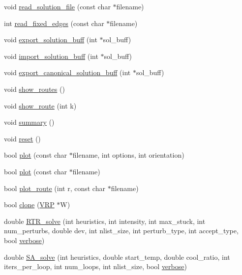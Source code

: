 \begin{DoxyCompactItemize}
\item 
void \hyperlink{class_v_r_p_a88640397d743e6b40095fc2b9a74ad96}{read\_\-solution\_\-file} (const char $\ast$filename)
\item 
int \hyperlink{class_v_r_p_a7b056dcb823f18a187ba74dfe46fe148}{read\_\-fixed\_\-edges} (const char $\ast$filename)
\item 
void \hyperlink{class_v_r_p_a7766815e5d2eaf7972078e389f3cb44d}{export\_\-solution\_\-buff} (int $\ast$sol\_\-buff)
\item 
void \hyperlink{class_v_r_p_a295efd4df161f2aac13aaaedf0e9448c}{import\_\-solution\_\-buff} (int $\ast$sol\_\-buff)
\item 
void \hyperlink{class_v_r_p_adb439544630c4817fc6e9373a3216ef5}{export\_\-canonical\_\-solution\_\-buff} (int $\ast$sol\_\-buff)
\item 
void \hyperlink{class_v_r_p_a220683d7cff96be26550a081f948cfd2}{show\_\-routes} ()
\item 
void \hyperlink{class_v_r_p_abe8dee5bd3d4ace4c38d9ec68b39e409}{show\_\-route} (int k)
\item 
void \hyperlink{class_v_r_p_a3bbbdd28b87f379ff56606c06b27393c}{summary} ()
\item 
void \hyperlink{class_v_r_p_a6c9d4499eab192e2af3de9ae2ee2d93a}{reset} ()
\item 
bool \hyperlink{class_v_r_p_a8c6b6d381f6c0940f7ee71ceaa393806}{plot} (const char $\ast$filename, int options, int orientation)
\item 
bool \hyperlink{class_v_r_p_a9583d909b7f2f8d550f3633d8d4aa897}{plot} (const char $\ast$filename)
\item 
bool \hyperlink{class_v_r_p_a10b8abb343d7826fc576aebd73ba11f9}{plot\_\-route} (int r, const char $\ast$filename)
\item 
bool \hyperlink{class_v_r_p_ad9c2a0f28188939816bbbd948df2378d}{clone} (\hyperlink{class_v_r_p}{VRP} $\ast$W)
\item 
double \hyperlink{class_v_r_p_add8a377bf3c6136beda15b2a571bc8ad}{RTR\_\-solve} (int heuristics, int intensity, int max\_\-stuck, int num\_\-perturbs, double dev, int nlist\_\-size, int perturb\_\-type, int accept\_\-type, bool \hyperlink{vrp__glpk__sp_8cpp_ab3f078684998b83967d507d0f453f454}{verbose})
\item 
double \hyperlink{class_v_r_p_a721540de1b77fe2c90aadd09a7491be8}{SA\_\-solve} (int heuristics, double start\_\-temp, double cool\_\-ratio, int iters\_\-per\_\-loop, int num\_\-loops, int nlist\_\-size, bool \hyperlink{vrp__glpk__sp_8cpp_ab3f078684998b83967d507d0f453f454}{verbose})

\end{DoxyCompactItemize}
